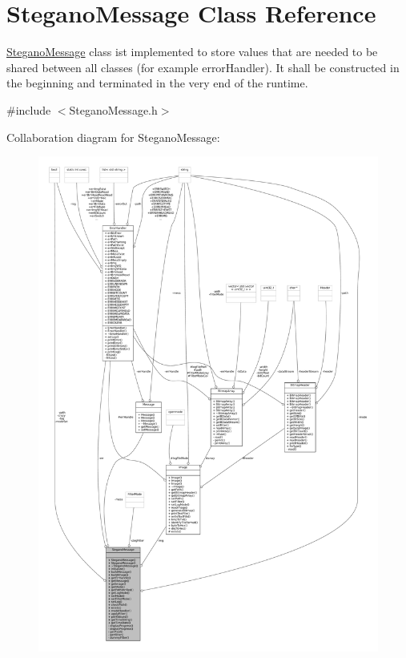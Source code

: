\hypertarget{classSteganoMessage}{}\section{Stegano\+Message Class Reference}
\label{classSteganoMessage}


\mbox{\hyperlink{classSteganoMessage}{Stegano\+Message}} class ist implemented to store values that are needed to be shared between all classes (for example error\+Handler). It shall be constructed in the beginning and terminated in the very end of the runtime.  




{\ttfamily \#include $<$Stegano\+Message.\+h$>$}



Collaboration diagram for Stegano\+Message\+:
\nopagebreak
\begin{figure}[H]
\begin{center}
\leavevmode
\includegraphics[width=350pt]{classSteganoMessage__coll__graph}
\end{center}
\end{figure}
